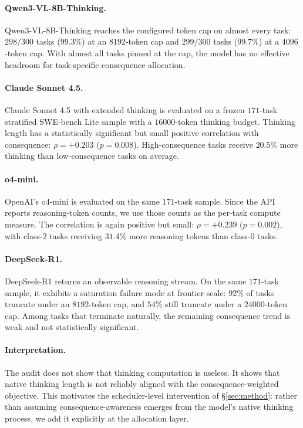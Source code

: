 \documentclass{article}
\begin{document}
\paragraph{Qwen3-VL-8B-Thinking.}
Qwen3-VL-8B-Thinking reaches the configured token cap on almost every
task: $298/300$ tasks ($99.3\%$) at an $8192$-token cap and
$299/300$ tasks ($99.7\%$) at a $4096$-token cap. With almost all
tasks pinned at the cap, the model has no effective headroom for
task-specific consequence allocation.

\paragraph{Claude Sonnet 4.5.}
Claude Sonnet 4.5 with extended thinking is evaluated on a frozen
$171$-task stratified SWE-bench Lite sample with a $16000$-token
thinking budget. Thinking length has a statistically significant but
small positive correlation with consequence:
$\rho=+0.203$ ($p=0.008$). High-consequence tasks receive $20.5\%$
more thinking than low-consequence tasks on average.

\paragraph{o4-mini.}
OpenAI's o4-mini is evaluated on the same $171$-task sample. Since the
API reports reasoning-token counts, we use those counts as the
per-task compute measure. The correlation is again positive but small:
$\rho=+0.239$ ($p=0.002$), with class-$2$ tasks receiving $31.4\%$
more reasoning tokens than class-$0$ tasks.

\paragraph{DeepSeek-R1.}
DeepSeek-R1 returns an observable reasoning stream. On the same
$171$-task sample, it exhibits a saturation failure mode at frontier
scale: $92\%$ of tasks truncate under an $8192$-token cap, and $54\%$
still truncate under a $24000$-token cap. Among tasks that terminate
naturally, the remaining consequence trend is weak and not
statistically significant.

\paragraph{Interpretation.}
The audit does not show that thinking computation is useless. It shows
that native thinking length is not reliably aligned with the
consequence-weighted objective. This motivates the scheduler-level
intervention of \S\ref{sec:method}: rather than assuming
consequence-awareness emerges from the model's native thinking process,
we add it explicitly at the allocation layer.
\end{document}
